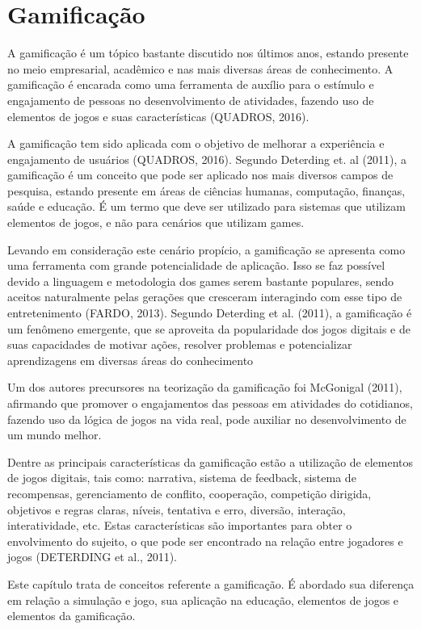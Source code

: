 \documentclass[
	12pt,				%
	oneside,			%
	a4paper,			%
	english,			%
	french,				%
	spanish,			%
	brazil,				%
	]{abntex2}
\begin{document}
\chapter{Gamificação}

A gamificação é um tópico bastante discutido nos últimos anos, estando presente no meio empresarial, acadêmico e nas mais diversas áreas de conhecimento. A gamificação é encarada como uma ferramenta de auxílio para o estímulo e engajamento de pessoas no desenvolvimento de atividades, fazendo uso de elementos de jogos e suas características (QUADROS, 2016).

A gamificação tem sido aplicada com o objetivo de melhorar a experiência e engajamento de usuários (QUADROS, 2016). Segundo Deterding et. al (2011), a gamificação é um conceito que pode ser aplicado nos mais diversos campos de pesquisa, estando presente em áreas de ciências humanas, computação, finanças, saúde e educação. É um termo que deve ser utilizado para sistemas que utilizam elementos de jogos, e não para cenários que utilizam games. 

Levando em consideração este cenário propício, a gamificação se apresenta como uma ferramenta com grande potencialidade de aplicação. Isso se faz possível devido a linguagem e metodologia dos games serem bastante populares, sendo aceitos naturalmente pelas gerações que cresceram interagindo com esse tipo de entretenimento (FARDO, 2013). Segundo Deterding et al. (2011), a gamificação é um fenômeno emergente, que se aproveita da popularidade dos jogos digitais e de suas capacidades de motivar ações, resolver problemas e potencializar aprendizagens em diversas áreas do conhecimento

Um dos autores precursores na teorização da gamificação foi McGonigal (2011), afirmando que promover o engajamentos das pessoas em atividades do cotidianos, fazendo uso da lógica de jogos na vida real, pode auxiliar no desenvolvimento de um mundo melhor.

Dentre as principais características da gamificação estão a utilização de elementos de jogos digitais, tais como: narrativa, sistema de feedback, sistema de recompensas, gerenciamento de conflito, cooperação, competição dirigida, objetivos e regras claras, níveis, tentativa e erro, diversão, interação, interatividade, etc. Estas características são importantes para obter o envolvimento do sujeito, o que pode ser encontrado na relação entre jogadores e jogos (DETERDING et al., 2011).

Este capítulo trata de conceitos referente a gamificação. É abordado sua diferença em relação a simulação e jogo, sua aplicação na educação, elementos de jogos e elementos da gamificação.
\end{document}
